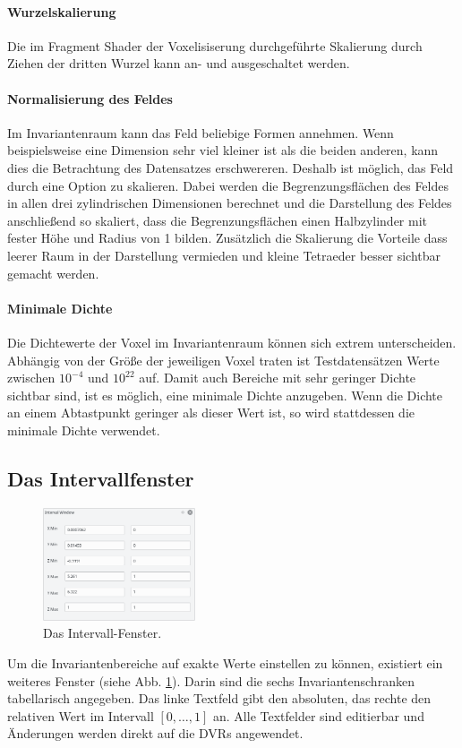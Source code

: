 \documentclass[a4paper,fontsize=12pt,toc=bib,halfparskip]{scrartcl}
\begin{document}
\paragraph{Wurzelskalierung}
Die im Fragment Shader der Voxelisiserung durchgef\"uhrte Skalierung durch Ziehen der dritten Wurzel kann an- und ausgeschaltet werden.

\paragraph{Normalisierung des Feldes}
Im Invariantenraum kann das Feld beliebige Formen annehmen. Wenn beispielsweise eine Dimension sehr viel kleiner ist als die beiden anderen, kann dies die Betrachtung des Datensatzes erschwereren. Deshalb ist m\"oglich, das Feld durch eine Option zu skalieren. Dabei werden die Begrenzungsfl\"achen des Feldes in allen drei zylindrischen Dimensionen berechnet und die Darstellung des Feldes anschlie{\ss}end so skaliert, dass die Begrenzungsfl\"achen einen Halbzylinder mit fester H\"ohe und Radius von 1 bilden. Zus\"atzlich die Skalierung die Vorteile dass leerer Raum in der Darstellung vermieden und kleine Tetraeder besser sichtbar gemacht werden.

\paragraph{Minimale Dichte}
Die Dichtewerte der Voxel im Invariantenraum k\"onnen sich extrem unterscheiden. Abh\"angig von der Gr\"o{\ss}e der jeweiligen Voxel traten ist Testdatens\"atzen Werte zwischen $10^{-4}$ und $10^22$ auf. Damit auch Bereiche mit sehr geringer Dichte sichtbar sind, ist es m\"oglich, eine minimale Dichte anzugeben. Wenn die Dichte an einem Abtastpunkt geringer als dieser Wert ist, so wird stattdessen die minimale Dichte verwendet.

\subsection{Das Intervallfenster}
\begin{figure}
	\centering
	\includegraphics[width=0.4\textwidth]{pictures/IntervalWindow.png}
	\caption{Das Intervall-Fenster.}
	\label{IntervalWindow}
\end{figure}
Um die Invariantenbereiche auf exakte Werte einstellen zu k\"onnen, existiert ein weiteres Fenster (siehe Abb. \ref{IntervalWindow}). Darin sind die sechs Invariantenschranken tabellarisch angegeben. Das linke Textfeld gibt den absoluten, das rechte den relativen Wert im Intervall $[0,\dots,1]$ an. Alle Textfelder sind editierbar und \"Anderungen werden direkt auf die DVRs angewendet.
\end{document}
